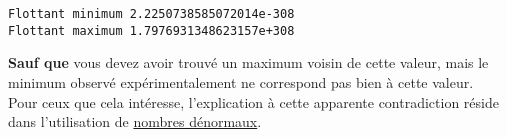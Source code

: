     \begin{Verbatim}[commandchars=\\\{\}]
Flottant minimum 2.2250738585072014e-308
Flottant maximum 1.7976931348623157e+308

    \end{Verbatim}

    \textbf{Sauf que} vous devez avoir trouvé un maximum voisin de cette
valeur, mais le minimum observé expérimentalement ne correspond pas bien
à cette valeur.\\

Pour ceux que cela intéresse, l'explication à cette apparente
contradiction réside dans l'utilisation de
\href{http://en.wikipedia.org/wiki/Denormal\%5Fnumber}{nombres
dénormaux}.